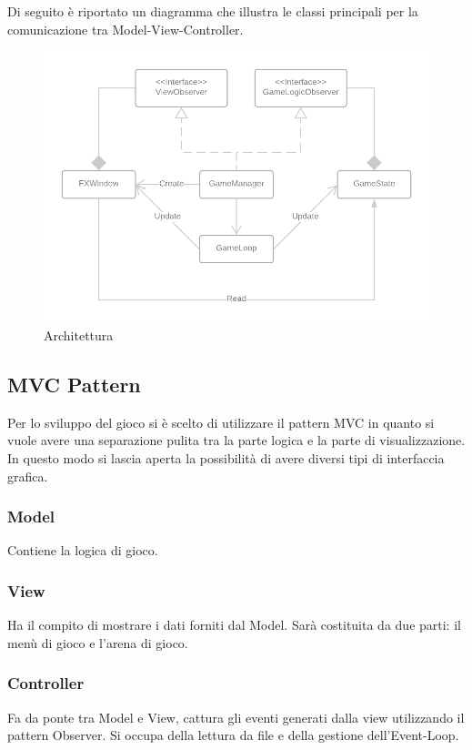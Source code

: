 Di seguito è riportato un diagramma che illustra le classi principali per la comunicazione tra Model-View-Controller.

\begin{figure}[H]
  \includegraphics[width=15cm]{res/MVC_Diagram.png}
  \caption{Architettura}
\end{figure}

\subsection{MVC Pattern}
Per lo sviluppo del gioco si è scelto di utilizzare il pattern MVC in quanto si vuole avere una separazione pulita tra la parte logica e la parte di visualizzazione. In questo modo si lascia aperta la possibilità di avere diversi tipi di interfaccia grafica.

\subsubsection{Model} Contiene la logica di gioco. 

\subsubsection{View} Ha il compito di mostrare i dati forniti dal Model. Sarà costituita da due parti: il menù di gioco e l'arena di gioco.

\subsubsection{Controller} Fa da ponte tra Model e View, cattura gli eventi generati dalla view utilizzando il pattern Observer. Si occupa della lettura da file e della gestione dell'Event-Loop.

